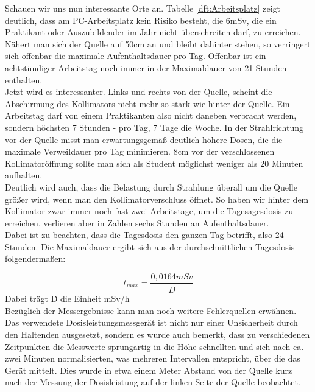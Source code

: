 Schauen wir uns nun interessante Orte an. Tabelle \ref{dft:Arbeitsplatz} zeigt deutlich, dass am PC-Arbeitsplatz kein Risiko besteht, die 6mSv, die ein Praktikant oder Auszubildender im Jahr nicht überschreiten darf, zu erreichen. Nähert man sich der Quelle auf 50cm an und bleibt dahinter stehen, so verringert sich offenbar die maximale Aufenthaltsdauer pro Tag. Offenbar ist ein achtstündiger Arbeitstag noch immer in der Maximaldauer von 21 Stunden enthalten. \\
Jetzt wird es interessanter. Links und rechts von der Quelle, scheint die Abschirmung des Kollimators nicht mehr so stark wie hinter der Quelle. Ein Arbeitstag darf von einem Praktikanten also nicht daneben verbracht werden, sondern höchsten 7 Stunden - pro Tag, 7 Tage die Woche. 
In der Strahlrichtung vor der Quelle misst man erwartungsgemäß deutlich höhere Dosen, die die maximale Verweildauer pro Tag minimieren. 8cm vor der verschlossenen Kollimatoröffnung sollte man sich als Student möglichst weniger als 20 Minuten aufhalten.\\
Deutlich wird auch, dass die Belastung durch Strahlung überall um die Quelle größer wird, wenn man den Kollimatorverschluss öffnet. So haben wir hinter dem Kollimator zwar immer noch fast zwei Arbeitstage, um die Tagesagesdosis zu erreichen, verlieren aber in Zahlen sechs Stunden an Aufenthaltsdauer. \\
Dabei ist zu beachten, dass die Tagesdosis den ganzen Tag betrifft, also 24 Stunden.
Die Maximaldauer ergibt sich aus der durchschnittlichen Tagesdosis folgendermaßen:

\begin{equation*}
    t_{max} = \frac{0,0164 mSv}{\dot D} 
\end{equation*}
\vspace{2mm}
Dabei trägt \.D die Einheit mSv/h\\
Bezüglich der Messergebnisse kann man noch weitere Fehlerquellen erwähnen. Das verwendete Dosisleistungsmessgerät  ist nicht nur einer Unsicherheit durch den Haltenden ausgesetzt, sondern es wurde auch bemerkt, dass zu verschiedenen Zeitpunkten die Messwerte sprungartig in die Höhe schnellten und sich nach ca. zwei Minuten normalisierten, was mehreren Intervallen entspricht, über die das Gerät mittelt. Dies wurde in etwa einem Meter Abstand von der Quelle kurz nach der Messung der Dosisleistung auf der linken Seite der Quelle beobachtet. 

